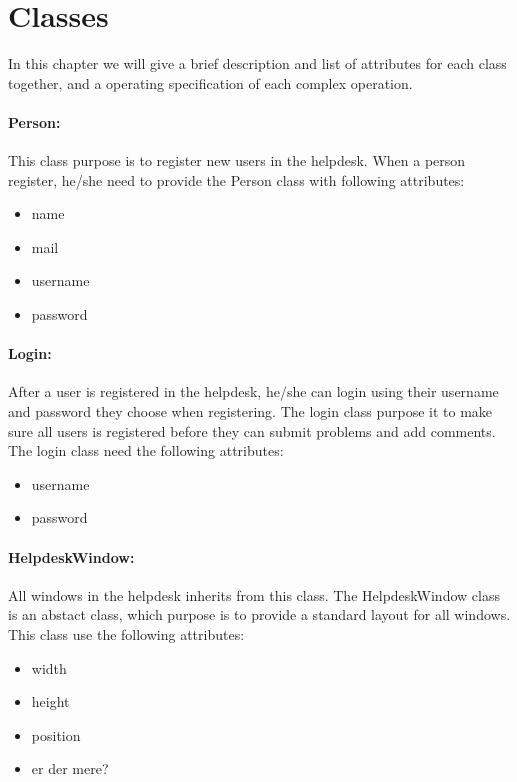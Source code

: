 \section{Classes}
In this chapter we will give a brief description and list of attributes for each class together, and a operating specification of each complex operation.

 \paragraph{Person:}This class purpose is to register new users in the helpdesk. When a person register, he/she need to provide the Person class with following attributes:
\begin{itemize}
 \item{name}
 \item{mail}
 \item{username}
 \item{password}
\end{itemize}
 
 \paragraph{Login:}After a user is registered in the helpdesk, he/she can login using their username and password they choose when registering. The login class purpose it to make sure all users is registered before they can submit problems and add comments. The login class need the following attributes: 
\begin{itemize}
 \item{username}
 \item{password}
\end{itemize}
 
 \paragraph{HelpdeskWindow:} All windows in the helpdesk inherits from this class. The HelpdeskWindow class is an abstact class, which purpose is to provide a standard layout for all windows. This class use the following attributes: 
\begin{itemize}
 \item{width}
 \item{height}
 \item{position}
 \item{er der mere?}
\end{itemize}

